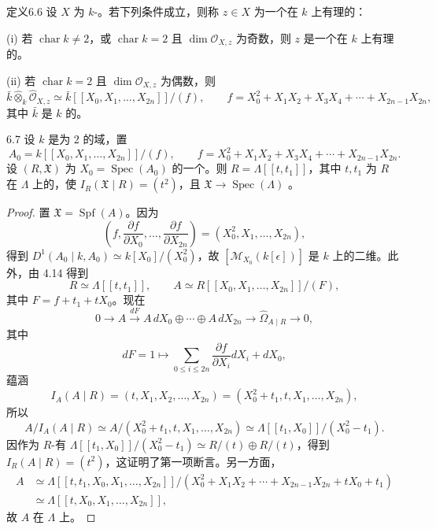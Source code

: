 \begin{SGAresult}{定义}{6.6}
设 $X$ 为 $k$-。若下列条件成立，则称 $z\in X$ 为一个在 $k$ 上有理的：

(i) 若 $\operatorname{char}k\ne2$，或 $\operatorname{char}k=2$ 且 $\dim\mathcal O_{X,z}$ 为奇数，则 $z$ 是一个在 $k$ 上有理的。

(ii) 若 $\operatorname{char}k=2$ 且 $\dim\mathcal O_{X,z}$ 为偶数，则
\[
\bar k\widehat\otimes_k\widehat{\mathcal O}_{X,z}\simeq
\bar k[[X_0,X_1,\ldots,X_{2n}]]/(f),
\qquad
f=X_0^2+X_1X_2+X_3X_4+\cdots+X_{2n-1}X_{2n},
\]
其中 $\bar k$ 是 $k$ 的。
\end{SGAresult}

\begin{SGAresult}{}{6.7}
设 $k$ 是为 $2$ 的域，置
\[
A_0=k[[X_0,X_1,\ldots,X_{2n}]]/(f),\qquad
f=X_0^2+X_1X_2+X_3X_4+\cdots+X_{2n-1}X_{2n}.
\]
设 $(R,\mathfrak X)$ 为 $X_0=\operatorname{Spec}(A_0)$ 的一个。则 $R=\Lambda[[t,t_1]]$，其中 $t,t_1$ 为 $R$ 在 $\Lambda$ 上的，使 $I_R(\mathfrak X\mid R)=(t^2)$，且 $\mathfrak X\to\operatorname{Spec}(\Lambda)$ 。
\end{SGAresult}
\begin{proof}
置 $\mathfrak X=\operatorname{Spf}(A)$。因为
\[
\left(f,\frac{\partial f}{\partial X_0},\ldots,\frac{\partial f}{\partial X_{2n}}\right)
 =(X_0^2,X_1,\ldots,X_{2n}),
\]
得到 $D^1(A_0\mid k,A_0)\simeq k[X_0]/(X_0^2)$，故 $[\mathcal M_{X_0}(k[\epsilon])]$ 是 $k$ 上的二维。此外，由 4.14 得到
\[
R\simeq\Lambda[[t,t_1]],\qquad
A\simeq R[[X_0,X_1,\ldots,X_{2n}]]/(F),
\]
其中 $F=f+t_1+tX_0$。现在
\[
0\longrightarrow A\xrightarrow{dF}A\,dX_0\oplus\cdots\oplus A\,dX_{2n}
 \longrightarrow\widehat\Omega_{A\mid R}\longrightarrow0,
\]
其中
\[
dF=1\longmapsto\sum_{0\leq i\leq2n}\frac{\partial f}{\partial X_i}dX_i+dX_0,
\]
蕴涵
\[
I_A(A\mid R)=(t,X_1,X_2,\ldots,X_{2n})
 =(X_0^2+t_1,t,X_1,\ldots,X_{2n}),
\]
所以
\[
A/I_A(A\mid R)\simeq A/(X_0^2+t_1,t,X_1,\ldots,X_{2n})
 \simeq\Lambda[[t_1,X_0]]/(X_0^2-t_1).
\]
因作为 $R$-有 $\Lambda[[t_1,X_0]]/(X_0^2-t_1)\simeq R/(t)\oplus R/(t)$，得到 $I_R(A\mid R)=(t^2)$，这证明了第一项断言。另一方面，
\[
\begin{aligned}
A&\simeq\Lambda[[t,t_1,X_0,X_1,\ldots,X_{2n}]]/
 (X_0^2+X_1X_2+\cdots+X_{2n-1}X_{2n}+tX_0+t_1)\\
 &\simeq\Lambda[[t,X_0,X_1,\ldots,X_{2n}]],
\end{aligned}
\]
故 $A$ 在 $\Lambda$ 上。
\end{proof}

